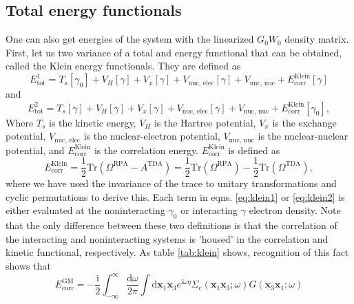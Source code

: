 \documentclass[12pt]{caltech_thesis}
\begin{document}
\subsection{Total energy functionals}
One can also get energies of the system with the linearized $G_0W_0$ density matrix. First, let us two variance of a total and energy functional that can be obtained, called the Klein energy functionals. They are defined as
\begin{equation}
    E_{\text{tot}}^{\mathrm{1}} = T_s [\gamma _{0}] + V_H [\gamma ] + V_x [\gamma ] + V_{\text{nuc, elec}} [\gamma ] + V_{\text{nuc, nuc}} + E_{\text{corr}} ^{\text{Klein}}[\gamma ]
\label{eq:klein1}
\end{equation}
and
\begin{equation}
    E_{\text{tot}}^2 = T_s [\gamma ] + V_H [\gamma ] + V_x [\gamma ] + V_{\text{nuc, elec}} [\gamma ] + V_{\text{nuc, nuc}} + E_{\text{corr}} ^{\text{Klein}}[\gamma_0],
\label{eq:klein2}
\end{equation}
Where $T_s$ is the kinetic energy, $V_H$ is the Hartree potential, $V_x$ is the exchange potential, $V_{\text{nuc, elec}}$ is the nuclear-electron potential, $V_{\text{nuc, nuc}}$ is the nuclear-nuclear potential, and $E_{\text{corr}} ^{\text{Klein}}$ is the correlation energy. $E_{\text{corr}} ^{\text{Klein}}$ is defined as
\begin{equation}
    E_{\text{corr}}^{\text{Klein}} = \frac{1}{2} \text{Tr} (\Omega ^{\text{RPA}} - A^{\text{TDA}})
    = \frac{1}{2} \text{Tr} (\Omega ^{\text{RPA}} ) - \frac{1}{2} \text{Tr} (\Omega ^{\text{TDA}}),
\end{equation}
where we have used the invariance of the trace to unitary transformations and cyclic permutations to derive this.
Each term in eqns. \ref{eq:klein1} or \ref{eq:klein2} is either evaluated at the noninteracting $\gamma _{0}$ or interacting $\gamma $ electron density. Note that the only difference between these two definitions is that the correlation of the interacting and noninteracting systems is 'housed' in the correlation and kinetic functional, respectively. As table \ref{tab:klein} shows, recognition of this fact shows that 
\begin{equation}
E_{\mathrm{corr}}^{\mathrm{GM}}=-\frac{\mathrm{i}}{2} \int_{-\infty}^{\infty} \frac{\mathrm{d} \omega}{2 \pi} \int \mathrm{d} \boldsymbol{x}_1 \boldsymbol{x}_3 e^{\mathrm{i} \omega \eta} \Sigma_{\mathrm{c}}\left(\boldsymbol{x}_1 \boldsymbol{x}_3 ; \omega\right) G\left(\boldsymbol{x}_3 \boldsymbol{x}_1 ; \omega\right)
\end{equation}
\end{document}
